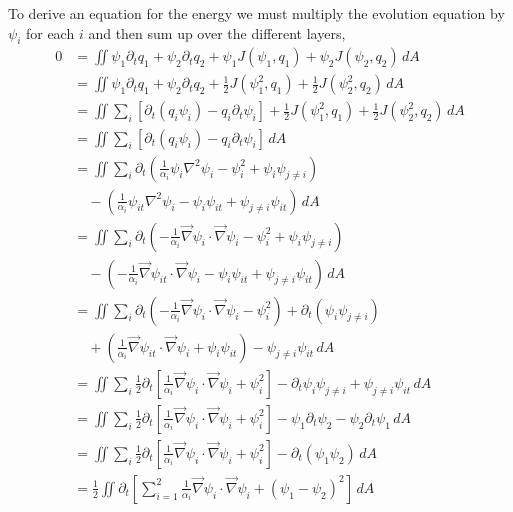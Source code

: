 \documentclass[12pt]{article}
\begin{document}
    To derive an equation for the energy we must multiply the evolution equation by $\psi_i$ for each $i$ and then sum up over the different layers,
    \begin{align*}
      0 &= \iint \psi_1 \partial_t q_1 + \psi_2 \partial_t q_2 + \psi_1 J(\psi_1, q_1) + \psi_2 J(\psi_2, q_2) \, dA \\
       &= \iint \psi_1 \partial_t q_1 + \psi_2 \partial_t q_2 + \frac12 J(\psi_1^2, q_1) + \frac12 J(\psi_2^2, q_2) \, dA \\
       &= \iint \sum_i \left[\partial_t(q_i \psi_i) - q_i \partial_t\psi_i \right] + \frac12 J(\psi_1^2, q_1) + \frac12 J(\psi_2^2, q_2) \, dA \\
       &= \iint \sum_i \left[\partial_t(q_i \psi_i) - q_i \partial_t\psi_i \right] \, dA \\
       &= \iint \sum_i \partial_t \left (\frac{1}{\alpha_i}\psi_i \nabla^2 \psi_i - \psi_i^2 + \psi_i\psi_{j\ne i} \right) \\
        &\quad - \left( \frac{1}{\alpha_i} \psi_{it} \nabla^2 \psi_i - \psi_i \psi_{it} + \psi_{j \ne i} \psi_{it} \right) \, dA \\
       &= \iint \sum_i \partial_t \left (-\frac{1}{\alpha_i} \vec\nabla \psi_i \cdot \vec\nabla \psi_i - \psi_i^2 + \psi_i\psi_{j\ne i} \right) \\
        &\quad - \left( -\frac{1}{\alpha_i} \vec\nabla \psi_{it} \cdot \vec\nabla \psi_i - \psi_i \psi_{it} + \psi_{j \ne i} \psi_{it} \right) \, dA \\
       &= \iint \sum_i \partial_t \left (-\frac{1}{\alpha_i} \vec\nabla \psi_i \cdot \vec\nabla \psi_i - \psi_i^2 \right) + \partial_t (\psi_i\psi_{j\ne i})  \\
        &\quad + \left( \frac{1}{\alpha_i} \vec\nabla \psi_{it} \cdot \vec\nabla \psi_i + \psi_i \psi_{it} \right) - \psi_{j \ne i} \psi_{it} \, dA \\
       &= \iint \sum_i \frac12 \partial_t \left[ \frac{1}{\alpha_i} \vec\nabla \psi_i \cdot \vec\nabla \psi_i + \psi_i^2 \right] - \partial_t \psi_i\psi_{j\ne i} + \psi_{j \ne i} \psi_{it} \, dA \\
       &= \iint  \sum_i \frac12 \partial_t \left[ \frac{1}{\alpha_i} \vec\nabla \psi_i \cdot  \vec\nabla \psi_i + \psi_i^2 \right] - \psi_1 \partial_t \psi_2  -  \psi_2 \partial_t \psi_1\, dA \\
       &= \iint  \sum_i \frac12 \partial_t \left[ \frac{1}{\alpha_i} \vec\nabla \psi_i \cdot  \vec\nabla \psi_i + \psi_i^2 \right] -  \partial_t (\psi_1\psi_2)\, dA \\
       &= \frac12 \iint \partial_t \left[ \sum_{i=1}^2 \frac{1}{\alpha_i} \vec\nabla \psi_i \cdot \vec\nabla \psi_i + (\psi_1 - \psi_2)^2 \right]\, dA
    \end{align*}
\end{document}
